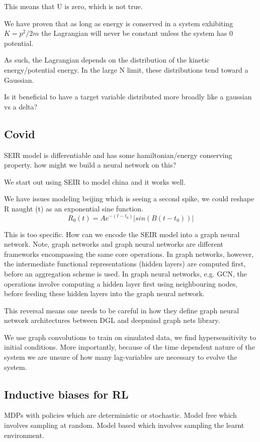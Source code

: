 \documentclass{article}
\begin{document}
This means that U is zero, which is not true.

We have proven that as long as energy is conserved in a system exhibiting $K = p^2/2m$ the Lagrangian will never be constant unless the system has 0 potential. 

As such, the Lagrangian depends on the distribution of the kinetic energy/potential energy. In the large N limit, these distributions tend toward a Gaussian.

Is it beneficial to have a target variable distributed more broadly like a gaussian vs a delta?


\subsection{Covid}


SEIR model is differentiable and has some hamiltonian/energy conserving property. how might we build a neural network on this?

We start out using SEIR to model china and it works well.

We have issues modeling beijing which is seeing a second spike, we could reshape R naught (t) as an exponential sine function.
$$ R_0(t) = Ae^{-(t-t_0)}|sin(B(t-t_0))| $$

This is too specific. How can we encode the SEIR model into a graph neural network. Note, graph networks and graph neural networks are different frameworks encompassing the same core operations. In graph networks, however, the intermediate functional representations (hidden layers) are computed first, before an aggregation scheme is used. In graph neural networks, e.g. GCN, the operations involve computing a hidden layer first using neighbouring nodes, before feeding these hidden layers into the graph neural network.

This reversal means one needs to be careful in how they define graph neural network architectures between DGL and deepmind graph nets library.

We use graph convolutions to train on simulated data, we find hypersensitivity to initial conditions. More importantly, because of the time dependent nature of the system we are unsure of how many lag-variables are necessary to evolve the system.

\subsection{Inductive  biases for RL}

MDPs with policies which are deterministic or stochastic. Model free which involves sampling at random. Model based which involves sampling the learnt environment.



\end{document}
